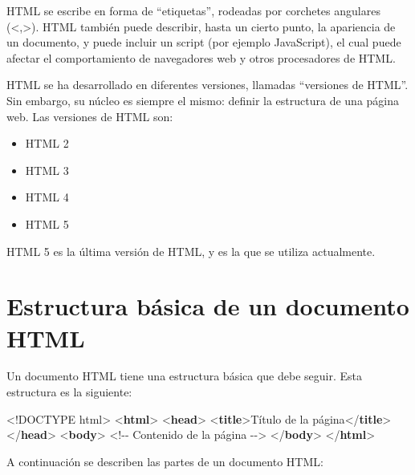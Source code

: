 \documentclass[
  a4paper,
  DIV=11,
  numbers=noendperiod,
  onepage,
  openany]{scrreprt}
\newenvironment{Shaded}{\begin{snugshade}}{\end{snugshade}}
\newcommand{\CommentTok}[1]{\textcolor[rgb]{0.37,0.37,0.37}{#1}}
\newcommand{\DataTypeTok}[1]{\textcolor[rgb]{0.68,0.00,0.00}{#1}}
\newcommand{\KeywordTok}[1]{\textcolor[rgb]{0.00,0.23,0.31}{\textbf{#1}}}
\newcommand{\NormalTok}[1]{\textcolor[rgb]{0.00,0.23,0.31}{#1}}
\providecommand{\tightlist}{%
  \setlength{\itemsep}{0pt}\setlength{\parskip}{0pt}}\usepackage{longtable,booktabs,array}
\begin{document}
\begin{tcolorbox}
HTML se escribe en forma de ``etiquetas'', rodeadas por corchetes
angulares (\textless,\textgreater). HTML también puede describir, hasta
un cierto punto, la apariencia de un documento, y puede incluir un
script (por ejemplo JavaScript), el cual puede afectar el comportamiento
de navegadores web y otros procesadores de HTML.

HTML se ha desarrollado en diferentes versiones, llamadas ``versiones de
HTML''. Sin embargo, su núcleo es siempre el mismo: definir la
estructura de una página web. Las versiones de HTML son:

\begin{itemize}
\tightlist
\item
  HTML 2
\item
  HTML 3
\item
  HTML 4
\item
  HTML 5
\end{itemize}

HTML 5 es la última versión de HTML, y es la que se utiliza actualmente.

\section{Estructura básica de un documento
HTML}\label{estructura-buxe1sica-de-un-documento-html}

Un documento HTML tiene una estructura básica que debe seguir. Esta
estructura es la siguiente:

\begin{Shaded}
\begin{Highlighting}[]
\DataTypeTok{\textless{}!DOCTYPE}\NormalTok{ html}\DataTypeTok{\textgreater{}}
\DataTypeTok{\textless{}}\KeywordTok{html}\DataTypeTok{\textgreater{}}
    \DataTypeTok{\textless{}}\KeywordTok{head}\DataTypeTok{\textgreater{}}
        \DataTypeTok{\textless{}}\KeywordTok{title}\DataTypeTok{\textgreater{}}\NormalTok{Título de la página}\DataTypeTok{\textless{}/}\KeywordTok{title}\DataTypeTok{\textgreater{}}
    \DataTypeTok{\textless{}/}\KeywordTok{head}\DataTypeTok{\textgreater{}}
    \DataTypeTok{\textless{}}\KeywordTok{body}\DataTypeTok{\textgreater{}}
        \CommentTok{\textless{}!{-}{-} Contenido de la página {-}{-}\textgreater{}}
    \DataTypeTok{\textless{}/}\KeywordTok{body}\DataTypeTok{\textgreater{}}
\DataTypeTok{\textless{}/}\KeywordTok{html}\DataTypeTok{\textgreater{}}
\end{Highlighting}
\end{Shaded}

A continuación se describen las partes de un documento HTML:


\end{tcolorbox}
\end{document}
